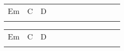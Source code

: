 \begin{multicols}{2}
\noindent
\begin{minipage}{\columnwidth}
\noindent
\noindent
\begin{tabular}{llllllllllll}
Em&C&D\\
\quad\quad\quad\quad&\quad\quad\quad&
\end{tabular}

\noindent
\begin{tabular}{llllllllllll}
Em&C&D\\
\quad\quad\quad\quad&\quad\quad\quad&
\end{tabular}
\end{minipage}\\

\end{multicols}